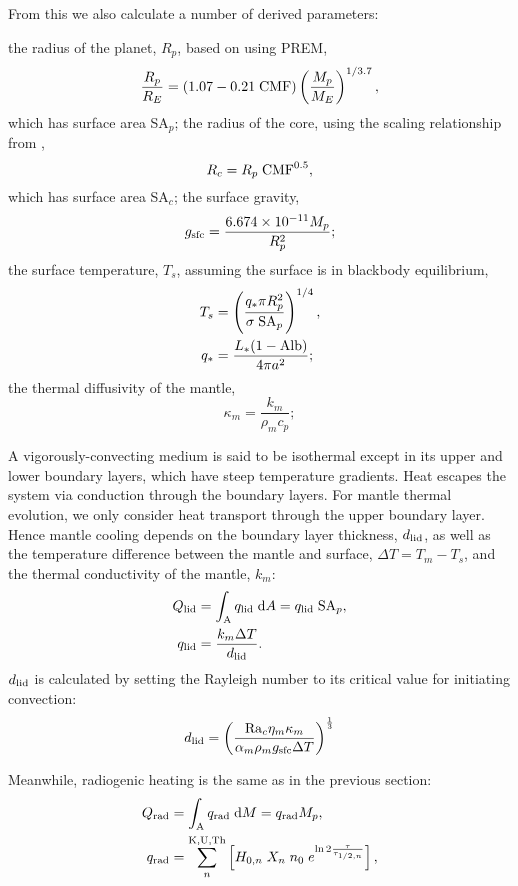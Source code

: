 \documentclass[10pt,a4paper]{article}
\begin{document}
From this we also calculate a number of derived parameters:

the radius of the planet, $R_p$, based on \citet{Zeng2016} using PREM,
\begin{equation}
\frac{R_p}{R_E} = (1.07 - 0.21\; {\rm CMF})\left(\frac{M_p}{M_E}\right)^{1/3.7},
\end{equation}
which has surface area SA$_p$; the radius of the core, using the scaling relationship from \citet{Zeng2017},
\begin{equation}
R_c = R_p \; {\rm CMF}^{0.5},
\end{equation}
which has surface area SA$_c$; the surface gravity,
\begin{equation}
g_{\rm sfc} =\frac{6.674\times 10^{-11}M_p}{R_p^2};
\end{equation}
the surface temperature, $T_s$, assuming the surface is in blackbody equilibrium,
\begin{align}
T_s &= \left(\frac{q_* \pi R_p^2}{\sigma \; {\rm SA}_p}\right)^{1/4},\\
q_* &= \frac{L_*(1-{\rm Alb})}{4 \pi a^2};
\end{align}
the thermal diffusivity of the mantle,
\begin{equation}
\kappa_m = \frac{k_m}{\rho_m c_p};
\end{equation}

A vigorously-convecting medium is said to be isothermal except in its upper and lower boundary layers, which have steep temperature gradients.  Heat escapes the system via conduction through the boundary layers. For mantle thermal evolution, we only consider heat transport through the upper boundary layer. Hence mantle cooling depends on the boundary layer thickness, $d_{\rm lid}$, as well as the temperature difference between the mantle and surface, $\Delta T = T_m - T_s$, and the thermal conductivity of the mantle, $k_m$:
\begin{align}
Q_{\rm lid} &= \int_{\rm A} q_{\rm lid} \; {\rm d}A = q_{\rm lid} \; {\rm SA}_p,\\
q_{\rm lid} &= \frac{k_m \Delta T}{d_{\rm lid}}.
\end{align}
$d_{\rm lid}$ is calculated by setting the Rayleigh number to its critical value for initiating convection:
\begin{equation}
d_{\rm lid} = \left(\frac{{\rm Ra}_c \eta_m \kappa_m}{\alpha_m \rho_m g_{\rm sfc} \Delta T}\right)^{\frac{1}{3}}
\end{equation}

Meanwhile, radiogenic heating is the same as in the previous section:
\begin{align}
Q_{\rm rad} &= \int_{\rm A} q_{\rm rad} \; {\rm d}M = q_{\rm rad} M_p,\\
q_{\rm rad} &= \sum^{\rm K, U, Th}_n \left[ H_{0, n} \; X_n \; n_0 \; e^{\ln 2 \frac{\tau}{\tau_{1/2 ,n}}} \right],
\end{align}
\end{document}
